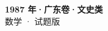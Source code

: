 \documentclass[zihao=-4, a4paper]{ctexart}
\begin{document}
\begin{center}
  {\Large\bfseries 1987 年·广东卷·文史类}\\[4pt]
  {\large 数学 · 试题版}
\end{center}
\medskip
{}

\end{document}
